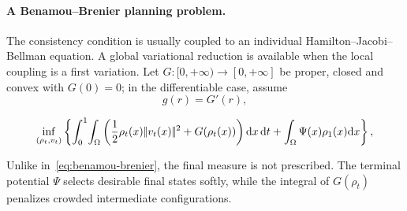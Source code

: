 \paragraph{A Benamou--Brenier planning problem.}
The consistency condition is usually coupled to an individual Hamilton--Jacobi--Bellman equation. A global variational reduction is available when the local coupling is a first variation. Let $G:[0,+\infty)\to[0,+\infty]$ be proper, closed and convex with $G(0)=0$; in the differentiable case, assume
\begin{equation}\label{eq-mfg-congestion-primitive}
g(r)=G'(r),
\end{equation}
\begin{defn}\label{def-variational-mfg-planning}
\begin{equation}\label{eq-variational-mfg-velocity}
\inf_{(\rho_t,v_t)}
\left\{
\int_0^1\!\int_{\Omega}
\left(
\frac12\rho_t(x)|\!| v_t(x) |\!|^2+G(\rho_t(x))
\right)\mathrm{d} x\,\mathrm{d} t
+\int_{\Omega}\Psi(x)\rho_1(x)\mathrm{d} x
\right\},
\end{equation}
\end{defn}
Unlike in~\eqref{eq:benamou-brenier}, the final measure is not prescribed. The terminal potential $\Psi$ selects desirable final states softly, while the integral of $G(\rho_t)$ penalizes crowded intermediate configurations.

